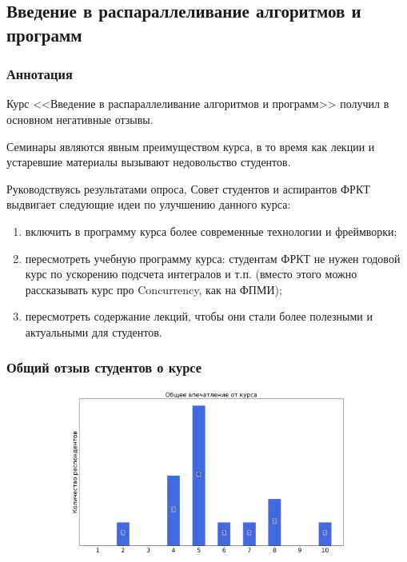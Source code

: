 \subsection{Введение в распараллеливание алгоритмов и программ}
	
	\subsubsection{Аннотация}

		Курс <<Введение в распараллеливание алгоритмов и программ>> получил в основном негативные отзывы. 
		
		Семинары являются явным преимуществом курса, в то время как лекции и устаревшие материалы вызывают недовольство студентов.

		Руководствуясь результатами опроса, Совет студентов и аспирантов ФРКТ выдвигает следующие идеи по улучшению данного курса:
		\begin{enumerate}
			\item включить в программу курса более современные технологии и фреймворки;
			\item пересмотреть учебную программу курса: студентам ФРКТ не нужен годовой курс по ускорению подсчета интегралов и т.п. (вместо этого можно рассказывать курс про Concurrency, как на ФПМИ); 
			\item пересмотреть содержание лекций, чтобы они стали более полезными и актуальными для студентов.
		\end{enumerate}

	\subsubsection{Общий отзыв студентов о курсе}

		\begin{figure}[H]
			\centering
			\begin{subfigure}[b]{0.45\textwidth}
				\centering
				\includegraphics[width=\textwidth]{images/4 course/Введение в распараллеливание алгоритмов и программ/general-0.png}
			\end{subfigure}
		\end{figure}

